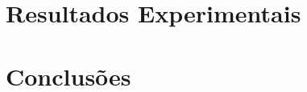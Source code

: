 \documentclass[a4paper,12pt,oneside,openany]{book}
\begin{document}
\chapter{Resultados Experimentais}
\label{cap5}


\chapter{Conclusões}
\label{cap6}


\normalsize
\cleardoublepage
{}




\backmatter
\end{document}
